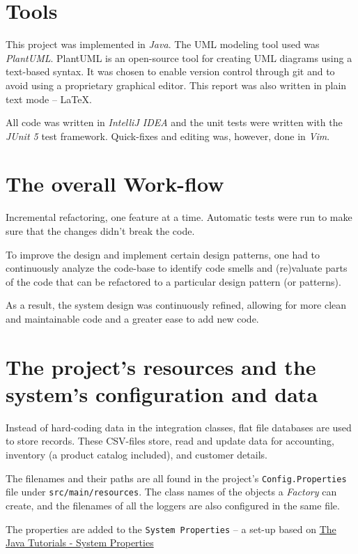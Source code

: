 \documentclass[a4paper]{scrreprt}
\begin{document}
\section*{Tools}
This project was implemented in \emph{Java}.
The UML modeling tool used was \emph{PlantUML}.
PlantUML is an open-source tool for creating UML diagrams using a text-based
syntax.
It was chosen to enable version control through git and to avoid using a
proprietary graphical editor.
This report was also written in plain text mode -- \LaTeX.

All code was written in \emph{IntelliJ IDEA} and the unit tests were written with the \emph{JUnit 5} test framework.
Quick-fixes and editing was, however, done in \emph{Vim}.

\section*{The overall Work-flow}
Incremental refactoring, one feature at a time.
Automatic tests were run to make sure that the changes didn't break the code.

To improve the design and implement certain design patterns,
one had to continuously analyze the code-base to identify code smells and
(re)valuate parts of the code that can be refactored to a
particular design pattern (or patterns).

As a result, the system design was continuously refined,
allowing for more clean and maintainable code and a greater ease to add new code.

\section*{The project's resources and the system's configuration and data}
Instead of hard-coding data in the integration classes,
flat file databases are used to store records.
These CSV-files store,
read and update data for accounting, inventory (a product catalog included), and customer details.

The filenames and their paths are all found in the project's \verb|Config.Properties|
file under \verb|src/main/resources|.
The class names of the objects a \emph{Factory} can create, and the filenames of all the loggers are also
configured in the same file.

The properties are added to the \verb|System Properties| -- a set-up based on
\href{https://docs.oracle.com/javase/tutorial/essential/environment/sysprop.html}{The Java\texttrademark{} Tutorials - System Properties}
\end{document}
